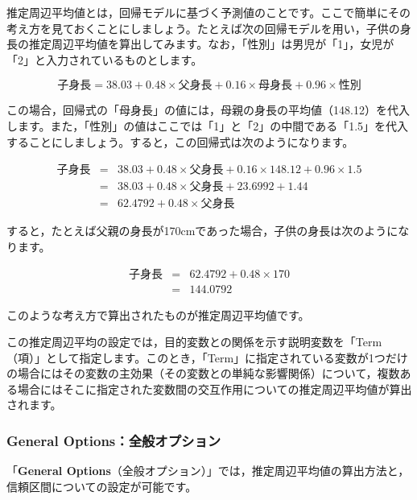 \documentclass[
  12pt,
  a5jpaper,
  lualatex, ja=standard]{bxjsbook}
\begin{document}
推定周辺平均値とは，回帰モデルに基づく予測値のことです。ここで簡単にその考え方を見ておくことにしましょう。たとえば次の回帰モデルを用い，子供の身長の推定周辺平均値を算出してみます。なお，「性別」は男児が「1」，女児が「2」と入力されているものとします。

\[
\text{子身長} = 38.03 + 0.48 \times \text{父身長} + 0.16 \times \text{母身長} + 0.96 \times \text{性別}
\]

この場合，回帰式の「母身長」の値には，母親の身長の平均値（148.12）を代入します。また，「性別」の値はここでは「1」と「2」の中間である「1.5」を代入することにしましょう。すると，この回帰式は次のようになります。

\begin{eqnarray*}
\text{子身長} &=& 38.03 + 0.48 \times \text{父身長} + 0.16 \times 148.12 + 0.96 \times 1.5 \\
                        &=& 38.03 + 0.48 \times \text{父身長} + 23.6992 + 1.44 \\
                        &=& 62.4792 + 0.48 \times \text{父身長}
\end{eqnarray*}

すると，たとえば父親の身長が170cmであった場合，子供の身長は次のようになります。

\begin{eqnarray*}
\text{子身長} &=& 62.4792 + 0.48 \times 170 \\
                        &=& 144.0792
\end{eqnarray*}

このような考え方で算出されたものが推定周辺平均値です。

この推定周辺平均の設定では，目的変数との関係を示す説明変数を「Term（項）」として指定します。このとき，「Term」に指定されている変数が1つだけの場合にはその変数の主効果（その変数との単純な影響関係）について，複数ある場合にはそこに指定された変数間の交互作用についての推定周辺平均値が算出されます。

\hypertarget{general-optionsux5168ux822cux30aaux30d7ux30b7ux30e7ux30f3-1}{%
\subsubsection*{General Options：全般オプション}\label{general-optionsux5168ux822cux30aaux30d7ux30b7ux30e7ux30f3-1}}

「\textbf{General Options}（全般オプション）」では，推定周辺平均値の算出方法と，信頼区間についての設定が可能です。
\end{document}
